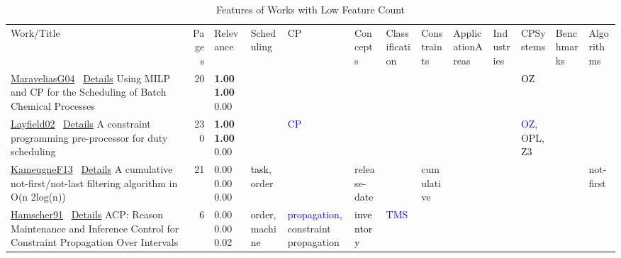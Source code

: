 {\scriptsize
\begin{longtable}{>{\raggedright\arraybackslash}p{3cm}r>{\raggedright\arraybackslash}p{1.0cm}>{\raggedright\arraybackslash}p{ 1.50cm}>{\raggedright\arraybackslash}p{ 1.50cm}>{\raggedright\arraybackslash}p{ 1.50cm}>{\raggedright\arraybackslash}p{ 1.50cm}>{\raggedright\arraybackslash}p{ 1.50cm}>{\raggedright\arraybackslash}p{ 1.50cm}>{\raggedright\arraybackslash}p{ 1.50cm}>{\raggedright\arraybackslash}p{ 1.50cm}>{\raggedright\arraybackslash}p{ 1.50cm}>{\raggedright\arraybackslash}p{ 1.50cm}}
\rowcolor{white}\caption{Features of Works with Low Feature Count}\\ \toprule
\rowcolor{white}Work/Title & Pages & Relevance & Scheduling& CP& Concepts& Classification& Constraints& ApplicationAreas& Industries& CPSystems& Benchmarks& Algorithms\\ \midrule\endhead
\bottomrule
\endfoot
\href{../scheduling/works/MaraveliasG04.pdf}{MaraveliasG04}~\cite{MaraveliasG04} \hyperref[detail:MaraveliasG04]{Details} Using {MILP} and {CP} for the Scheduling of Batch Chemical Processes & 20 & \noindent{}\textbf{1.00} \textbf{1.00} \textcolor{black!50}{0.00} &  &  &  &  &  &  &  & \textcolor{black}{OZ} &  & \\
\href{../scheduling/works/Layfield02.pdf}{Layfield02}~\cite{Layfield02} \hyperref[detail:Layfield02]{Details} A constraint programming pre-processor for duty scheduling & 230 & \noindent{}\textbf{1.00} \textbf{1.00} \textcolor{black!50}{0.00} &  & \textcolor{blue}{CP} &  &  &  &  &  & \textcolor{blue}{OZ}, \textcolor{black!40}{OPL}, \textcolor{black!40}{Z3} &  & \\
\href{../scheduling/works/KameugneF13.pdf}{KameugneF13}~\cite{KameugneF13} \hyperref[detail:KameugneF13]{Details} A cumulative not-first/not-last filtering algorithm in O(n 2log(n)) & 21 & \noindent{}\textcolor{black!50}{0.00} \textcolor{black!50}{0.00} \textcolor{black!50}{0.00} & \textcolor{black}{task}, \textcolor{black!40}{order} &  & \textcolor{black!40}{release-date} &  & \textcolor{black!40}{cumulative} &  &  &  &  & \textcolor{black!40}{not-first}\\
\href{../scheduling/works/Hamscher91.pdf}{Hamscher91}~\cite{Hamscher91} \hyperref[detail:Hamscher91]{Details} {ACP:} Reason Maintenance and Inference Control for Constraint Propagation Over Intervals & 6 & \noindent{}\textcolor{black!50}{0.00} \textcolor{black!50}{0.00} \textcolor{black!50}{0.02} & \textcolor{black!40}{order}, \textcolor{black!40}{machine} & \textcolor{blue}{propagation}, \textcolor{black!40}{constraint propagation} & \textcolor{black}{inventory} & \textcolor{blue}{TMS} &  &  &  &  &  & \\

\end{longtable}}
